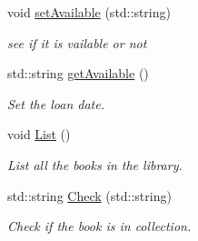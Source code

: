 \begin{DoxyCompactItemize}
void \hyperlink{classBook_a5077a2720ae494b0725a0b7baeb3e7f2}{set\+Available} (std\+::string)
\begin{DoxyCompactList}\small\item\em see if it is vailable or not \end{DoxyCompactList}\item 
std\+::string \hyperlink{classBook_a41d272a411cef781cbd44cb7eca9ac60}{get\+Available} ()
\begin{DoxyCompactList}\small\item\em Set the loan date. \end{DoxyCompactList}\item 
void \hyperlink{classBook_a2214e9b5fc10c125d8043b1dc50277f4}{List} ()
\begin{DoxyCompactList}\small\item\em List all the books in the library. \end{DoxyCompactList}\item 
std\+::string \hyperlink{classBook_a70e045711b346124d81f16210a67277a}{Check} (std\+::string)
\begin{DoxyCompactList}\small\item\em Check if the book is in collection. \end{DoxyCompactList}\end{DoxyCompactItemize}

